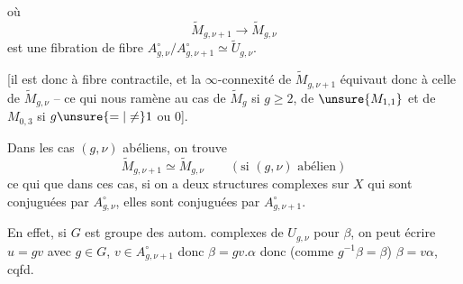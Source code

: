 où
\[
 \widetilde M_{g,\nu+1}\longrightarrow\widetilde M_{g,\nu}
 \tag{85}
\]
est  une fibration de fibre \(A_{g,\nu}^{\circ}/A_{g,\nu+1}^{\circ}\simeq\widetilde U_{g,\nu}\).

[il est donc à fibre contractile, et la \(\infty\)-connexité de \(\widetilde M_{g,\nu+1}\) équivaut donc à celle de \(\widetilde M_{g,\nu}\) -- ce qui nous ramène au cas de \(\widetilde M_g\) si \(g\geq 2\), de \(\unsure{M_{1,1}}\) et de \(M_{0,3}\) si \(g\unsure{=|\neq}1\) ou 0].

Dans les cas \((g,\nu)\) abéliens, on trouve
\[
 \widetilde M_{g,\nu+1}\simeq\widetilde M_{g,\nu}\qquad
 (\text{si }(g,\nu)\text{ abélien})
 \tag{85}
\]
ce qui    que dans ces cas, si on a deux structures complexes \inserted{\(\alpha,\beta\)} sur \(X\) qui sont conjuguées par  \(A_{g,\nu}^{\circ}\),  elles sont  conjuguées par \(A_{g,\nu+1}^{\circ}\).

En effet, si \(G\) est   groupe des autom. complexes de \(U_{g,\nu}\) pour \(\beta\), on peut écrire \(u=gv\) avec \(g\in G\), \(v\in A_{g,\nu+1}^{\circ}\) donc \(\beta=gv.\alpha\) donc (comme \(g^{-1}\beta=\beta\)) \(\beta=v\alpha\), cqfd.
